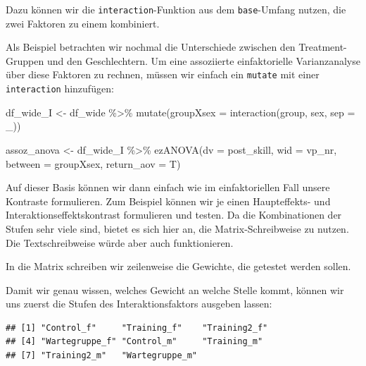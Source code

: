 \documentclass[
]{book}
\newenvironment{Shaded}{\begin{snugshade}}{\end{snugshade}}
\newcommand{\AttributeTok}[1]{\textcolor[rgb]{0.77,0.63,0.00}{#1}}
\newcommand{\FunctionTok}[1]{\textcolor[rgb]{0.00,0.00,0.00}{#1}}
\newcommand{\NormalTok}[1]{#1}
\newcommand{\OtherTok}[1]{\textcolor[rgb]{0.56,0.35,0.01}{#1}}
\newcommand{\SpecialCharTok}[1]{\textcolor[rgb]{0.00,0.00,0.00}{#1}}
\newcommand{\StringTok}[1]{\textcolor[rgb]{0.31,0.60,0.02}{#1}}
\begin{document}
Dazu können wir die \texttt{interaction}-Funktion aus dem \texttt{base}-Umfang nutzen, die zwei Faktoren zu einem kombiniert.

Als Beispiel betrachten wir nochmal die Unterschiede zwischen den Treatment-Gruppen und den Geschlechtern.
Um eine assoziierte einfaktorielle Varianzanalyse über diese Faktoren zu rechnen, müssen wir einfach ein \texttt{mutate} mit einer \texttt{interaction} hinzufügen:

\begin{Shaded}
\begin{Highlighting}[]
\NormalTok{df\_wide\_I }\OtherTok{\textless{}{-}}\NormalTok{ df\_wide }\SpecialCharTok{\%\textgreater{}\%} 
  \FunctionTok{mutate}\NormalTok{(}\AttributeTok{groupXsex =} \FunctionTok{interaction}\NormalTok{(group, sex, }\AttributeTok{sep =} \StringTok{\textquotesingle{}\_\textquotesingle{}}\NormalTok{))}

\NormalTok{assoz\_anova }\OtherTok{\textless{}{-}}\NormalTok{ df\_wide\_I }\SpecialCharTok{\%\textgreater{}\%} 
  \FunctionTok{ezANOVA}\NormalTok{(}\AttributeTok{dv =}\NormalTok{ post\_skill,}
          \AttributeTok{wid =}\NormalTok{ vp\_nr,}
          \AttributeTok{between =}\NormalTok{ groupXsex,}
          \AttributeTok{return\_aov =}\NormalTok{ T)}
\end{Highlighting}
\end{Shaded}

Auf dieser Basis können wir dann einfach wie im einfaktoriellen Fall unsere Kontraste formulieren. Zum Beispiel können wir je einen Haupteffekts- und Interaktionseffektskontrast formulieren und testen. Da die Kombinationen der Stufen sehr viele sind, bietet es sich hier an, die Matrix-Schreibweise zu nutzen. Die Textschreibweise würde aber auch funktionieren.

In die Matrix schreiben wir zeilenweise die Gewichte, die getestet werden sollen.

Damit wir genau wissen, welches Gewicht an welche Stelle kommt, können wir uns zuerst die Stufen des Interaktionsfaktors ausgeben lassen:

\begin{Shaded}
\end{Shaded}

\begin{verbatim}
## [1] "Control_f"     "Training_f"    "Training2_f"  
## [4] "Wartegruppe_f" "Control_m"     "Training_m"   
## [7] "Training2_m"   "Wartegruppe_m"
\end{verbatim}
\end{document}

